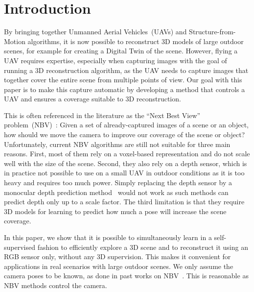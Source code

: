 \section{Introduction}
\label{sec:intro}


By bringing together Unmanned Aerial Vehicles~(UAVs) and Structure-from-Motion algorithms, it is now possible to reconstruct 3D models of large outdoor scenes, for example for creating a Digital Twin of the scene. However, flying a UAV requires expertise, especially when capturing images with the goal of running a 3D reconstruction algorithm, as the UAV needs to capture images that together cover the entire scene from multiple points of view. Our goal with this paper is to make this capture automatic by developing a method that controls a UAV and ensures a coverage suitable to 3D reconstruction.


This is often referenced in the literature as the ``Next Best View'' problem~(NBV)~\cite{connolly-father-paper}:  Given a set of already-captured images of a scene or an object, how should we move the camera to improve our coverage of the scene or object? Unfortunately, current NBV algorithms are still not suitable for three main reasons. First, most of them rely on a voxel-based representation and do not scale well with the size of the scene. Second, they also rely on a depth sensor, which is in practice not possible to use on a small UAV in outdoor conditions as it is too heavy and requires too much power. Simply replacing the depth sensor by a monocular depth prediction method~\cite{Ranftl2022, Wei2021CVPR, Miangoleh2021Boosting} would not work as such methods can predict depth only up to a scale factor. The third limitation is that they require 3D models for learning to predict how much a pose will increase the scene coverage. 


% 

In this paper, we show that it is possible to simultaneously learn in a self-supervised fashion to efficiently explore a 3D scene and to reconstruct it using an RGB sensor only, without any 3D supervision. This makes it convenient for applications in real scenarios with large outdoor scenes.  We only assume the camera poses to be known, as done in past works on NBV~\cite{zeng-icirs20-pcnbv, hepp-corr18-learntoscore, mendoza-prl2020}. This is reasonable as NBV methods control the camera.


